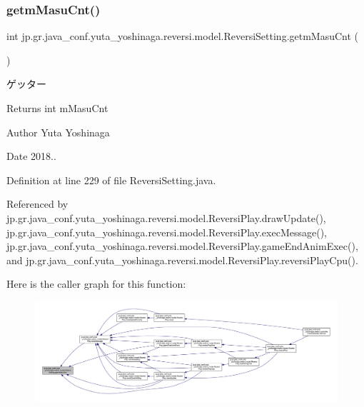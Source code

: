 \subsubsection{\texorpdfstring{getm\+Masu\+Cnt()}{getmMasuCnt()}}
{\footnotesize\ttfamily int jp.\+gr.\+java\+\_\+conf.\+yuta\+\_\+yoshinaga.\+reversi.\+model.\+Reversi\+Setting.\+getm\+Masu\+Cnt (\begin{DoxyParamCaption}{ }\end{DoxyParamCaption})}



ゲッター 

\begin{DoxyReturn}{Returns}
int m\+Masu\+Cnt 
\end{DoxyReturn}
\begin{DoxyAuthor}{Author}
Yuta Yoshinaga 
\end{DoxyAuthor}
\begin{DoxyDate}{Date}
2018.. 
\end{DoxyDate}


Definition at line 229 of file Reversi\+Setting.\+java.



Referenced by jp.\+gr.\+java\+\_\+conf.\+yuta\+\_\+yoshinaga.\+reversi.\+model.\+Reversi\+Play.\+draw\+Update(), jp.\+gr.\+java\+\_\+conf.\+yuta\+\_\+yoshinaga.\+reversi.\+model.\+Reversi\+Play.\+exec\+Message(), jp.\+gr.\+java\+\_\+conf.\+yuta\+\_\+yoshinaga.\+reversi.\+model.\+Reversi\+Play.\+game\+End\+Anim\+Exec(), and jp.\+gr.\+java\+\_\+conf.\+yuta\+\_\+yoshinaga.\+reversi.\+model.\+Reversi\+Play.\+reversi\+Play\+Cpu().

Here is the caller graph for this function\+:
\nopagebreak
\begin{figure}[H]
\begin{center}
\leavevmode
\includegraphics[width=350pt]{classjp_1_1gr_1_1java__conf_1_1yuta__yoshinaga_1_1reversi_1_1model_1_1_reversi_setting_a6d13d516a1c7eb51d781286ddf5ea2fb_icgraph}
\end{center}
\end{figure}
\mbox{\label{classjp_1_1gr_1_1java__conf_1_1yuta__yoshinaga_1_1reversi_1_1model_1_1_reversi_setting_a8db0caa8f0a20b5f39441dc02618eb49}} 
